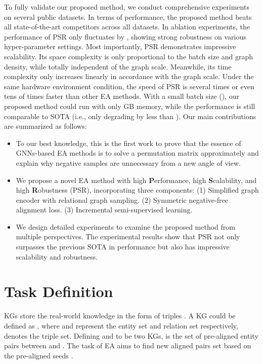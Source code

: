 \documentclass[sigconf]{acmart}
\begin{document}
To fully validate our proposed method, we conduct comprehensive experiments on several public datasets.
In terms of performance, the proposed method beats all state-of-the-art competitors across all datasets.
In ablation experiments, the performance of PSR only fluctuates by , showing strong robustness on various hyper-parameter settings.
Most importantly, PSR demonstrates impressive scalability.
Its space complexity is only proportional to the batch size and graph density, while totally independent of the graph scale.
Meanwhile, its time complexity only increases linearly in accordance with the graph scale.
Under the same hardware environment condition, the speed of PSR is several times or even tens of times faster than other EA methods.
With a small batch size (), our proposed method could run with only  GB memory, while the performance is still comparable to SOTA (i.e., only degrading by less than ).
Our main contributions are summarized as follows:
\begin{itemize}
  \item To our best knowledge, this is the first work to prove that the essence of GNNs-based EA methods is to solve a permutation matrix approximately and explain why negative samples are unnecessary from a new angle of view.
  \item We propose a novel EA method with high \textbf{P}erformance, high \textbf{S}calability, and high \textbf{R}obustness (PSR), incorporating three components:
  (1) Simplified graph encoder with relational graph sampling. (2) Symmetric negative-free alignment loss. (3) Incremental semi-supervised learning.
  \item We design detailed experiments to examine the proposed method from multiple perspectives. The experimental results show that PSR not only surpasses the previous SOTA in performance but also has impressive scalability and robustness.

\end{itemize}

\section{Task Definition}
\label {sec:TF}
KGs store the real-world knowledge in the form of triples .
A KG could be defined as , where  and  represent the entity set and relation set respectively,  denotes the triple set.
Defining  and  to be two KGs,  is the set of pre-aligned entity pairs between  and . 
The task of EA aims to find new aligned pairs set  based on the pre-aligned seeds .
\end{document}
